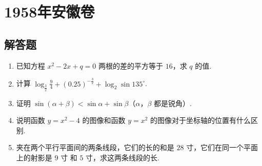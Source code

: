 \chapter{1958年安徽卷}

\section{解答题}

\begin{problem}
\begin{enumerate}
\item 已知方程 \(x^{2}-2x+q=0\) 两根的差的平方等于 \(16\)，求 \(q\) 的值.
\item 计算 \(\log_{\frac{3}{2}}\frac{9}{4}+\left(0.25\right)^{-\frac{3}{2}}+\log_{2}\sin135^{\circ}\).
\item 证明 \(\sin\left(\alpha+\beta\right)<\sin\alpha+\sin\beta\)（\(\alpha\)，\(\beta\) 都是锐角）.
\item 说明函数 \(y=x^{2}-4\) 的图像和函数 \(y=x^{2}\) 的图像对于坐标轴的位置有什么区别.
\item 夹在两个平行平面间的两条线段，它们的长的和是 \(28\text{ 寸}\)，它们在同一个平面上的射影是 \(9\text{ 寸}\) 和 \(5\text{ 寸}\)，求这两条线段的长.
\end{enumerate}
\end{problem}

